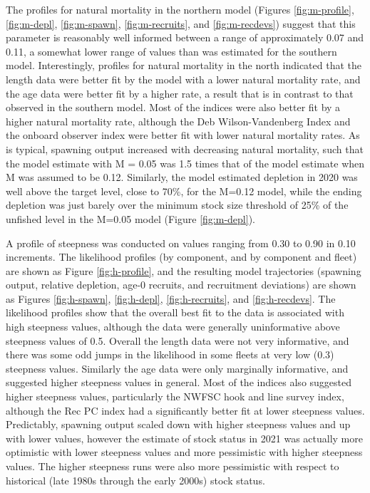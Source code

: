 \documentclass[
  english,
  a4paper,
]{article}
\begin{document}
The profiles for natural mortality in the northern model (Figures \ref{fig:m-profile}, \ref{fig:m-depl}, \ref{fig:m-spawn}, \ref{fig:m-recruits}, and \ref{fig:m-recdevs}) suggest that this parameter is reasonably well informed between a range of approximately 0.07 and 0.11, a somewhat lower range of values than was estimated for the southern model. Interestingly, profiles for natural mortality in the north indicated that the length data were better fit by the model with a lower natural mortality rate, and the age data were better fit by a higher rate, a result that is in contrast to that observed in the southern model. Most of the indices were also better fit by a higher natural mortality rate, although the Deb Wilson-Vandenberg Index and the onboard observer index were better fit with lower natural mortality rates. As is typical, spawning output increased with decreasing natural mortality, such that the model estimate with M = 0.05 was 1.5 times that of the model estimate when M was assumed to be 0.12. Similarly, the model estimated depletion in 2020 was well above the target level, close to 70\%, for the M=0.12 model, while the ending depletion was just barely over the minimum stock size threshold of 25\% of the unfished level in the M=0.05 model (Figure \ref{fig:m-depl}).

A profile of steepness was conducted on values ranging from 0.30 to 0.90 in 0.10 increments. The likelihood profiles (by component, and by component and fleet) are shown as Figure \ref{fig:h-profile}, and the resulting model trajectories (spawning output, relative depletion, age-0 recruits, and recruitment deviations) are shown as Figures \ref{fig:h-spawn}, \ref{fig:h-depl}, \ref{fig:h-recruits}, and \ref{fig:h-recdevs}. The likelihood profiles show that the overall best fit to the data is associated with high steepness values, although the data were generally uninformative above steepness values of 0.5. Overall the length data were not very informative, and there was some odd jumps in the likelihood in some fleets at very low (0.3) steepness values. Similarly the age data were only marginally informative, and suggested higher steepness values in general. Most of the indices also suggested higher steepness values, particularly the NWFSC hook and line survey index, although the Rec PC index had a significantly better fit at lower steepness values. Predictably, spawning output scaled down with higher steepness values and up with lower values, however the estimate of stock status in 2021 was actually more optimistic with lower steepness values and more pessimistic with higher steepness values. The higher steepness runs were also more pessimistic with respect to historical (late 1980s through the early 2000s) stock status.
\end{document}
